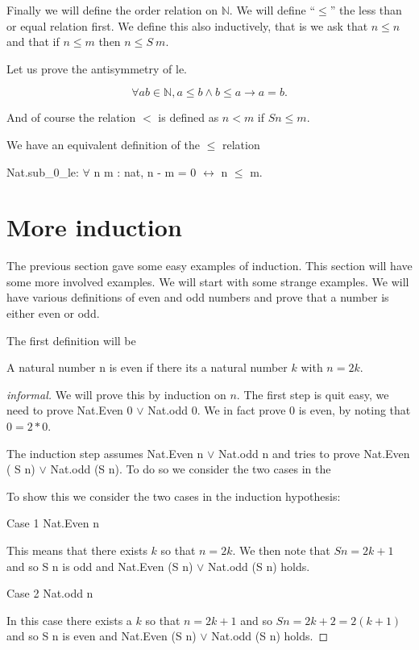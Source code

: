 Finally we will define the order relation on $\mathbb{N}$. We will define ``$\le$'' the less than or equal relation first. We define this also inductively, that is we ask that $n\le n$ and that  if $n\le m$ then $n\le S \ m$.
 
Let us prove the antisymmetry of le.

\begin{lemma}[antisym]
$$\forall a b \in \mathbb{N}, a \le b \land b \le a \rightarrow a=b.$$
\end{lemma}
 
 
    
 And of course the relation $<$ is defined as $n<m$ if $S n \le m$.
 
 
 We have an equivalent definition of the $\le$ relation
 
 
Nat.sub\_0\_le: $\forall$ n m : nat, n - m = 0 $\leftrightarrow$ n $\le$ m.



\section{More induction}\label{more induction}

The previous section gave some easy examples of induction. This section will have some more involved examples. We will start with some strange examples. We will have various definitions of even and odd numbers and prove that a number is either even or odd.

The first definition will be

\begin{definition}
A natural  number n is even if there its a natural number $k$ with $n =2k$.
\end{definition}


\begin{proof}[informal]
We will prove this by induction on $n$.
The first step is quit easy, we need to prove Nat.Even 0 $\lor$ Nat.odd 0. We in fact prove 0 is even, by noting that $0 = 2*0$.

The induction step assumes
 Nat.Even n $ \lor$ Nat.odd n and tries to prove  Nat.Even ( S n) $\lor$ Nat.odd (S n). To do so we consider the two cases in the

To show this we consider the two cases in the induction hypothesis:

Case 1 Nat.Even n

This means that there exists $k$ so that $n = 2k$. We then note that $S n = 2k+1$ and so  S n is odd and Nat.Even (S n) $\lor $ Nat.odd  (S n) holds.

Case 2 Nat.odd n 

In this case there exists a $k$ so that $n = 2k+1$ and so $S n = 2k+2 = 2(k+1)$ and so S n is even and Nat.Even (S n) $\lor $ Nat.odd  (S n) holds.


\end{proof}

